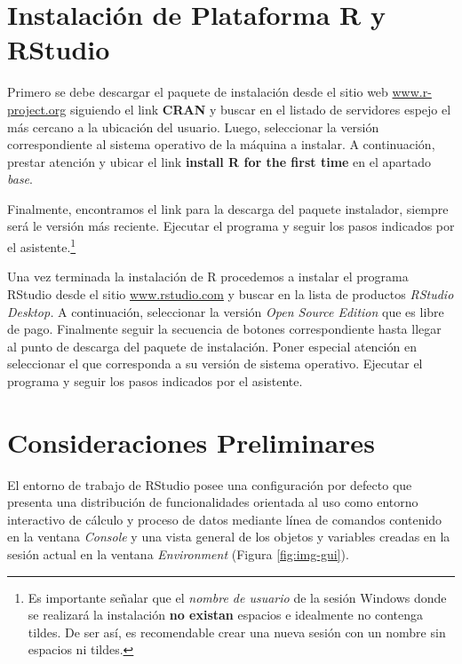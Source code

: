 \documentclass[
]{book}
\begin{document}
\hypertarget{inst-pla}{%
\section{Instalación de Plataforma R y RStudio}\label{inst-pla}}

Primero se debe descargar el paquete de instalación desde el sitio web \href{https://www.r-project.org/}{www.r-project.org} siguiendo el link \textbf{CRAN} y buscar en el listado de servidores espejo el más cercano a la ubicación del usuario. Luego, seleccionar la versión correspondiente al sistema operativo de la máquina a instalar. A continuación, prestar atención y ubicar el link \textbf{install R for the first time} en el apartado \emph{base}.

Finalmente, encontramos el link para la descarga del paquete instalador, siempre será le versión más reciente. Ejecutar el programa y seguir los pasos indicados por el asistente.\footnote{Es importante señalar que el \emph{nombre de usuario} de la sesión Windows donde se realizará la instalación \textbf{no existan} espacios e idealmente no contenga tildes. De ser así, es recomendable crear una nueva sesión con un nombre sin espacios ni tildes.}

Una vez terminada la instalación de R procedemos a instalar el programa RStudio desde el sitio \href{https://www.rstudio.com}{www.rstudio.com} y buscar en la lista de productos \emph{RStudio Desktop.} A continuación, seleccionar la versión \emph{Open Source Edition} que es libre de pago. Finalmente seguir la secuencia de botones correspondiente hasta llegar al punto de descarga del paquete de instalación. Poner especial atención en seleccionar el que corresponda a su versión de sistema operativo. Ejecutar el programa y seguir los pasos indicados por el asistente.

\hypertarget{con-pre}{%
\section{Consideraciones Preliminares}\label{con-pre}}

El entorno de trabajo de RStudio posee una configuración por defecto que presenta una distribución de funcionalidades orientada al uso como entorno interactivo de cálculo y proceso de datos mediante línea de comandos contenido en la ventana \emph{Console} y una vista general de los objetos y variables creadas en la sesión actual en la ventana \emph{Environment} (Figura \ref{fig:img-gui}).
\end{document}
